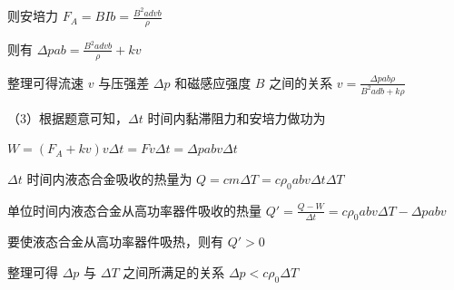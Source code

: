 \documentclass[\gkver]{gaokaozhenti}
\begin{document}
\begin{enumerate}
{则安培力 $F_{A} = BIb = \frac{B^{2}advb}{\rho}$

则有 $\Delta pab = \frac{B^{2}advb}{\rho} + kv$

整理可得流速 $v$ 与压强差 $\Delta p$ 和磁感应强度 $B$ 之间的关系 $v = \frac{\Delta pab\rho}{B^{2}adb + k\rho}$

（3）根据题意可知，$\Delta t$ 时间内黏滞阻力和安培力做功为

$W = (F_{A} + kv)v\Delta t = Fv\Delta t = \Delta pabv\Delta t$

$\Delta t$ 时间内液态合金吸收的热量为 $Q = cm\Delta T = c\rho_{0}abv\Delta t\Delta T$

单位时间内液态合金从高功率器件吸收的热量 $Q' = \frac{Q - W}{\Delta t} = c\rho_{0}abv\Delta T - \Delta pabv$

要使液态合金从高功率器件吸热，则有 $Q' > 0$

整理可得 $\Delta p$ 与 $\Delta T$ 之间所满足的关系 $\Delta p < c\rho_{0}\Delta T$
}

\end{enumerate}
\end{document}
